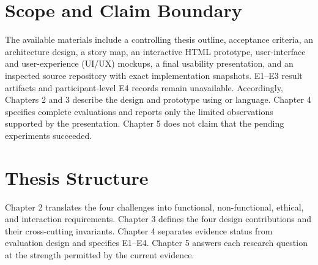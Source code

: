 \section{Scope and Claim Boundary}

The available materials include a controlling thesis outline, acceptance criteria, an architecture design, a story map, an interactive HTML prototype, user-interface and user-experience (UI/UX) mockups, a final usability presentation, and an inspected source repository with exact implementation snapshots.
E1--E3 result artifacts and participant-level E4 records remain unavailable.
Accordingly, Chapters 2 and 3 describe the design and prototype using \planned{} or \observed{} language.
Chapter 4 specifies complete evaluations and reports only the limited observations supported by the presentation.
Chapter 5 does not claim that the pending experiments succeeded.

\section{Thesis Structure}

Chapter 2 translates the four challenges into functional, non-functional, ethical, and interaction requirements.
Chapter 3 defines the four design contributions and their cross-cutting invariants.
Chapter 4 separates evidence status from evaluation design and specifies E1--E4.
Chapter 5 answers each research question at the strength permitted by the current evidence.
